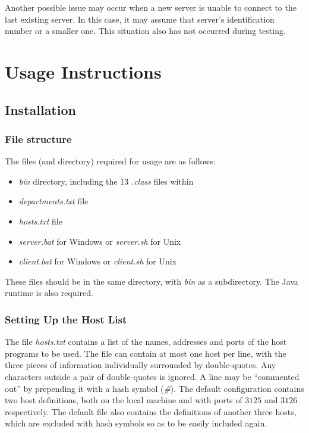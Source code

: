 \documentclass[a4paper,11pt]{article}
\begin{document}
Another possible issue may occur when a new server is unable to connect to the last existing server. In this case, it may assume that server's identification number or a smaller one. This situation also has not occurred during testing.

\section{Usage Instructions}
\subsection{Installation}
\subsubsection{File structure}
The files (and directory) required for usage are as follows:

\begin{itemize}
\item \emph{bin} directory, including the 13 \emph{.class} files within
\item \emph{departments.txt} file
\item \emph{hosts.txt} file
\item \emph{server.bat} for Windows or \emph{server.sh} for Unix
\item \emph{client.bat} for Windows or \emph{client.sh} for Unix
\end{itemize}

\noindent
These files should be in the same directory, with \emph{bin} as a subdirectory. The Java runtime is also required.

\subsubsection{Setting Up the Host List}
The file \emph{hosts.txt} contains a list of the names, addresses and ports of the host programs to be used. The file can contain at most one host per line, with the three pieces of information individually surrounded by double-quotes. Any characters outside a pair of double-quotes is ignored. A line may be ``commented out'' by prepending it with a hash symbol (\emph{\#}). The default configuration contains two host definitions, both on the local machine and with ports of $3125$ and $3126$ respectively. The default file also contains the definitions of another three hosts, which are excluded with hash symbols so as to be easily included again.
\end{document}
